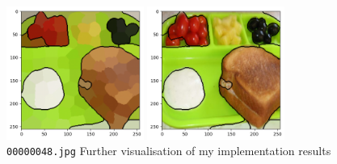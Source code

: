 \documentclass[conference]{IEEEtran}
\begin{document}
	
	\begin{figure}[htbp]
		\centerline{\includegraphics[width = 0.4\textwidth]{badslic.png}}
		\centerline{\includegraphics[width = 0.4\textwidth]{badbackground.png}}
		\caption{\texttt{00000048.jpg} Further visualisation of my implementation results}
		\label{fig:extra_vis2}
	\end{figure}
	
	
\end{document}

